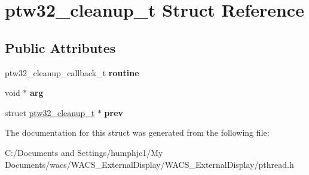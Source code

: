 \hypertarget{structptw32__cleanup__t}{
\section{ptw32\_\-cleanup\_\-t Struct Reference}
\label{structptw32__cleanup__t}
}
\subsection*{Public Attributes}
\begin{DoxyCompactItemize}
\item 
\hypertarget{structptw32__cleanup__t_ad197a94dcb95ce712f2d8f6c141a9aef}{
ptw32\_\-cleanup\_\-callback\_\-t {\bfseries routine}}
\label{structptw32__cleanup__t_ad197a94dcb95ce712f2d8f6c141a9aef}

\item 
\hypertarget{structptw32__cleanup__t_a2a4e7cc43435bafabdbcdfa892da4d88}{
void $\ast$ {\bfseries arg}}
\label{structptw32__cleanup__t_a2a4e7cc43435bafabdbcdfa892da4d88}

\item 
\hypertarget{structptw32__cleanup__t_a01e8236d7e28e823b8277e81e9e03d03}{
struct \hyperlink{structptw32__cleanup__t}{ptw32\_\-cleanup\_\-t} $\ast$ {\bfseries prev}}
\label{structptw32__cleanup__t_a01e8236d7e28e823b8277e81e9e03d03}

\end{DoxyCompactItemize}


The documentation for this struct was generated from the following file:\begin{DoxyCompactItemize}
\item 
C:/Documents and Settings/humphjc1/My Documents/wacs/WACS\_\-ExternalDisplay/WACS\_\-ExternalDisplay/pthread.h\end{DoxyCompactItemize}
